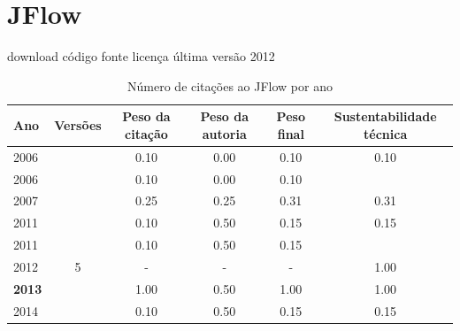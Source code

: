 \section{JFlow}
\checkmark download
\checkmark código fonte
\checkmark licença
\checkmark última versão 2012


\begin{table}[H]
\caption{Número de citações ao JFlow por ano}
\centering
\begin{tabular}{| l | c | c | c | c | c |}
  \hline
  Ano & Versões & Peso da citação & Peso da autoria & Peso final & Sustentabilidade técnica \\
  \hline
            2006
          &
          
          &
          0.10
          &
          0.00
          &
          0.10
          &
            {\color{red} 0.10}
          \\
            2006
          &
          
          &
          0.10
          &
          0.00
          &
          0.10
          &
          \\
\hline
            2007
          &
          
          &
          0.25
          &
          0.25
          &
          0.31
          &
            {\color{red} 0.31}
          \\
\hline
            2011
          &
          
          &
          0.10
          &
          0.50
          &
          0.15
          &
            {\color{red} 0.15}
          \\
            2011
          &
          
          &
          0.10
          &
          0.50
          &
          0.15
          &
          \\
\hline
        2012 & 5 & - & - & -
        &
          {\color{blue} 1.00}
        \\
\hline
            {\bf 2013}
          &
          
          &
          1.00
          &
          0.50
          &
          1.00
          &
            {\color{blue} 1.00}
          \\
\hline
            2014
          &
          
          &
          0.10
          &
          0.50
          &
          0.15
          &
            {\color{red} 0.15}
          \\
\hline
\end{tabular}
\end{table}



